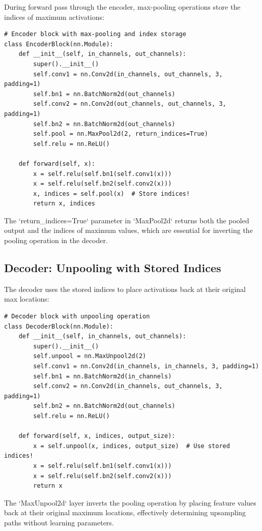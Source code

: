 \documentclass[11pt,a4paper]{report}
\begin{document}
During forward pass through the encoder, max-pooling operations store the indices of maximum activations:

\begin{lstlisting}
# Encoder block with max-pooling and index storage
class EncoderBlock(nn.Module):
    def __init__(self, in_channels, out_channels):
        super().__init__()
        self.conv1 = nn.Conv2d(in_channels, out_channels, 3, padding=1)
        self.bn1 = nn.BatchNorm2d(out_channels)
        self.conv2 = nn.Conv2d(out_channels, out_channels, 3, padding=1)
        self.bn2 = nn.BatchNorm2d(out_channels)
        self.pool = nn.MaxPool2d(2, return_indices=True)
        self.relu = nn.ReLU()

    def forward(self, x):
        x = self.relu(self.bn1(self.conv1(x)))
        x = self.relu(self.bn2(self.conv2(x)))
        x, indices = self.pool(x)  # Store indices!
        return x, indices
\end{lstlisting}

The `return_indices=True` parameter in `MaxPool2d` returns both the pooled output and the indices of maximum values, which are essential for inverting the pooling operation in the decoder.

\subsection*{Decoder: Unpooling with Stored Indices}

The decoder uses the stored indices to place activations back at their original max locations:

\begin{lstlisting}
# Decoder block with unpooling operation
class DecoderBlock(nn.Module):
    def __init__(self, in_channels, out_channels):
        super().__init__()
        self.unpool = nn.MaxUnpool2d(2)
        self.conv1 = nn.Conv2d(in_channels, in_channels, 3, padding=1)
        self.bn1 = nn.BatchNorm2d(in_channels)
        self.conv2 = nn.Conv2d(in_channels, out_channels, 3, padding=1)
        self.bn2 = nn.BatchNorm2d(out_channels)
        self.relu = nn.ReLU()

    def forward(self, x, indices, output_size):
        x = self.unpool(x, indices, output_size)  # Use stored indices!
        x = self.relu(self.bn1(self.conv1(x)))
        x = self.relu(self.bn2(self.conv2(x)))
        return x
\end{lstlisting}

The `MaxUnpool2d` layer inverts the pooling operation by placing feature values back at their original maximum locations, effectively determining upsampling paths without learning parameters.
\end{document}
